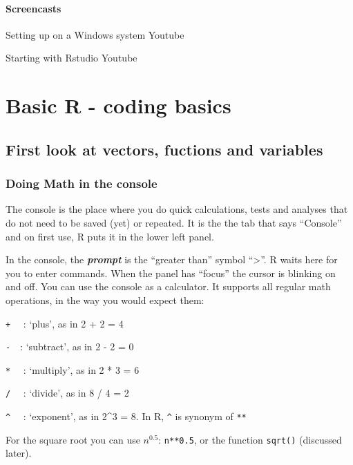 \documentclass[]{book}
\begin{document}
\hypertarget{screencasts}{%
\subsubsection{Screencasts}\label{screencasts}}

Setting up on a Windows system
Youtube

Starting with Rstudio
Youtube

\hypertarget{basic-r---coding-basics}{%
\chapter{Basic R - coding basics}\label{basic-r---coding-basics}}

\hypertarget{first-look-at-vectors-fuctions-and-variables}{%
\section{First look at vectors, fuctions and variables}\label{first-look-at-vectors-fuctions-and-variables}}

\hypertarget{doing-math-in-the-console}{%
\subsection{Doing Math in the console}\label{doing-math-in-the-console}}

The console is the place where you do quick calculations, tests and analyses that do not need to be saved (yet) or repeated. It is the the tab that says ``Console'' and on first use, R puts it in the lower left panel.

In the console, the \textbf{\emph{prompt}} is the ``greater than'' symbol ``\textgreater{}''. R waits here for you to enter commands. When the panel has ``focus'' the cursor is blinking on and off. You can use the console as a calculator. It supports all regular math operations, in the way you would expect them:

\texttt{+}  : `plus', as in 2 + 2 = 4

\texttt{-} : `subtract', as in 2 - 2 = 0

\texttt{*}  : `multiply', as in 2 * 3 = 6

\texttt{/}  : `divide', as in 8 / 4 = 2

\texttt{\^{}}  : `exponent', as in 2\^{}3 = 8. In R, \texttt{\^{}} is synonym of \texttt{**}

For the square root you can use \(n^{0.5}\): \texttt{n**0.5}, or the function \texttt{sqrt()} (discussed later).
\end{document}
